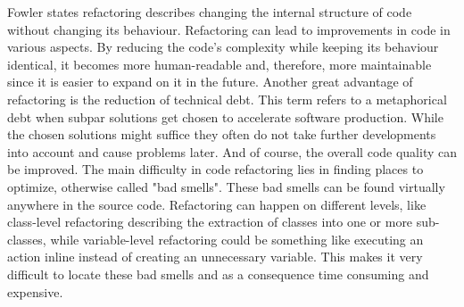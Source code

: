 Fowler states refactoring describes changing the internal structure of code without changing its behaviour.\cite{fowler2018refactoring} 
Refactoring can lead to improvements in code in various aspects. By reducing the code's complexity while keeping its behaviour identical, it becomes more human-readable and, therefore, more maintainable since it is easier to expand on it in the future. \cite{kaur2016analysis}
Another great advantage of refactoring is the reduction of technical debt. This term refers to a metaphorical debt when subpar solutions get chosen to accelerate software production. While the chosen solutions might suffice they often do not take further developments into account and cause problems later. \cite{techdebt}
And of course, the overall code quality can be improved.
The main difficulty in code refactoring lies in finding places to optimize, otherwise called "bad smells". These bad smells can be found virtually anywhere in the source code. Refactoring can happen on different levels, like class-level refactoring describing the extraction of classes into one or more sub-classes, while variable-level refactoring could be something like executing an action inline instead of creating an unnecessary variable. \cite{aniche2020effectiveness} This makes it very difficult to locate these bad smells and as a consequence time consuming and expensive.